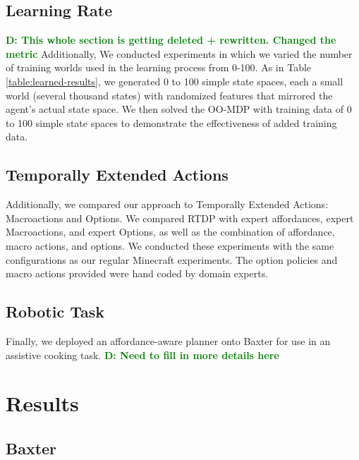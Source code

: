 \documentclass[conference]{IEEEtran}
\newcommand{\dnote}[1]{\textcolor{Green}{\textbf{D: #1}}}
\begin{document}
\subsection{Learning Rate}
\dnote{This whole section is getting deleted + rewritten. Changed the metric}
Additionally, We conducted experiments in which we varied the number of training worlds
used in the learning process from 0-100. As in Table \ref{table:learned-results}, we generated 0 to 100 simple state
spaces, each a small world (several thousand states) with randomized features that mirrored the agent's actual state space. We then solved
the OO-MDP with training data of 0 to 100 simple state spaces to demonstrate the effectiveness of added training data.

\subsection{Temporally Extended Actions}
Additionally, we compared our approach to Temporally Extended Actions: Macroactions and Options. We compared RTDP with expert affordances,
expert Macroactions, and expert Options, as well as the combination of affordance, macro actions, and options. We conducted these experiments with the same configurations as our regular Minecraft experiments. The option policies and macro actions provided were hand coded by domain experts.

\subsection{Robotic Task}
Finally, we deployed an affordance-aware planner onto Baxter for use in an assistive cooking task. \dnote{Need to fill in more details here}

\section{Results}
\label{sec:results}

\subsection{Baxter}
\end{document}
